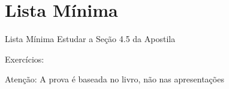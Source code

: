 \section{Lista Mínima}

\begin{frame}{Lista Mínima}
  Estudar a Seção 4.5 da Apostila

  Exercícios:

  \vfill
  Atenção: A prova é baseada no livro, não nas apresentações
\end{frame}


